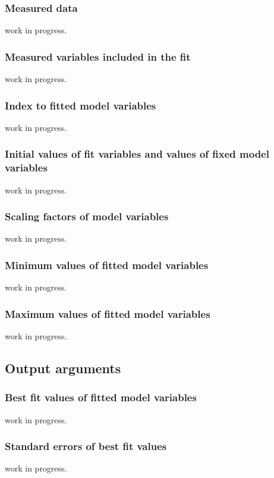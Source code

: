 \documentclass[12pt]{article}
\begin{document}
\subsubsection{Measured data}
work in progress.

\subsubsection{Measured variables included in the fit}
work in progress.

\subsubsection{Index to fitted model variables}
work in progress.

\subsubsection{Initial values of fit variables and values of fixed model variables}
work in progress.

\subsubsection{Scaling factors of model variables}
work in progress.

\subsubsection{Minimum values of fitted model variables}
work in progress.

\subsubsection{Maximum values of fitted model variables}
work in progress.


\subsection{Output arguments}

\subsubsection{Best fit values of fitted model variables}
work in progress.

\subsubsection{Standard errors of best fit values}
work in progress.
\end{document}
